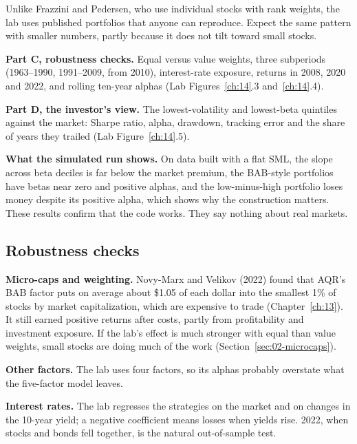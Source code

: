 Unlike Frazzini and Pedersen, who use individual stocks with rank weights, the lab uses published portfolios that anyone can reproduce. Expect the same pattern with smaller numbers, partly because it does not tilt toward small stocks.

\textbf{Part C, robustness checks.} Equal versus value weights, three subperiods (1963--1990, 1991--2009, from 2010), interest-rate exposure, returns in 2008, 2020 and 2022, and rolling ten-year alphas (Lab Figures~\ref{ch:14}.3 and~\ref{ch:14}.4).

\textbf{Part D, the investor's view.} The lowest-volatility and lowest-beta quintiles against the market: Sharpe ratio, alpha, drawdown, tracking error and the share of years they trailed (Lab Figure~\ref{ch:14}.5).

\textbf{What the simulated run shows.} On data built with a flat SML, the slope across beta deciles is far below the market premium, the BAB-style portfolios have betas near zero and positive alphas, and the low-minus-high portfolio loses money despite its positive alpha, which shows why the construction matters. These results confirm that the code works. They say nothing about real markets.

\subsection{Robustness checks}
\label{sec:18-stress}

\textbf{Micro-caps and weighting.} Novy-Marx and Velikov (2022) found that AQR's BAB factor puts on average about \$1.05 of each dollar into the smallest 1\% of stocks by market capitalization, which are expensive to trade (Chapter~\ref{ch:13}). It still earned positive returns after costs, partly from profitability and investment exposure. If the lab's effect is much stronger with equal than value weights, small stocks are doing much of the work (Section~\ref{sec:02-microcaps}).

\textbf{Other factors.} The lab uses four factors, so its alphas probably overstate what the five-factor model leaves.

\textbf{Interest rates.} The lab regresses the strategies on the market and on changes in the 10-year yield; a negative coefficient means losses when yields rise. 2022, when stocks and bonds fell together, is the natural out-of-sample test.


